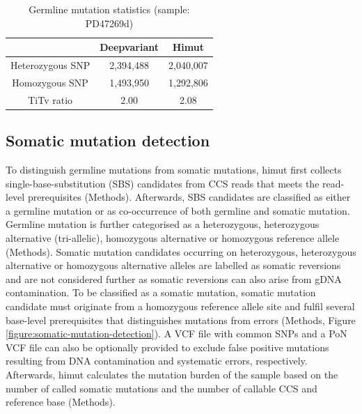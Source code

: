 \begin{table}[h!]
\caption{Germline mutation statistics (sample: PD47269d)}
\label{tab:adapter-miscalling-statistics}
\begin{tabular}{c|c|c}
& Deepvariant & Himut \\ \hline
Heterozygous SNP & 2,394,488 & 2,040,007 \\ \hline
Homozygous SNP & 1,493,950 & 1,292,806 \\ \hline
TiTv ratio & 2.00 & 2.08 \\ \hline
\end{tabular}
\end{table}

\subsection{Somatic mutation detection}

To distinguish germline mutations from somatic mutations, himut first collects single-base-substitution (SBS) candidates from CCS reads that meets the read-level prerequisites (Methods). Afterwards, SBS candidates are classified as either a germline mutation or as co-occurrence of both germline and somatic mutation. Germline mutation is further categorised as a heterozygous, heterozygous alternative (tri-allelic), homozygous alternative or homozygous reference allele (Methods). Somatic mutation candidates occurring on heterozygous, heterozygous alternative or homozygous alternative alleles are labelled as somatic reversions and are not considered further as somatic reversions can also arise from gDNA contamination. To be classified as a somatic mutation, somatic mutation candidate must originate from a homozygous reference allele site and fulfil several base-level prerequisites that distinguishes mutations from errors (Methods, Figure \ref{figure:somatic-mutation-detection}). A VCF file with common SNPs and a PoN VCF file can also be optionally provided to exclude false positive mutations resulting from DNA contamination and systematic errors, respectively. Afterwards, himut calculates the mutation burden of the sample based on the number of called somatic mutations and the number of callable CCS and reference base (Methods). 

